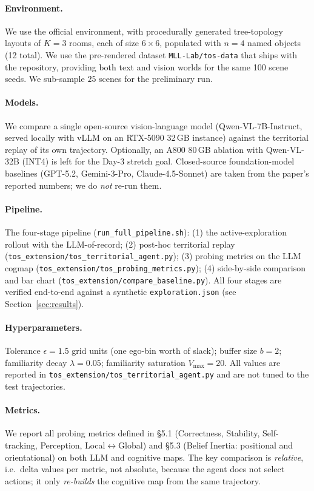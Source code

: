 \paragraph{Environment.} We use the official \tos environment, with
procedurally generated tree-topology layouts of $K{=}3$ rooms, each
of size $6{\times}6$, populated with $n{=}4$ named objects (12 total).
We use the pre-rendered dataset \texttt{MLL-Lab/tos-data} that ships
with the \tos repository, providing both text and vision worlds for
the same 100 scene seeds. We sub-sample $25$ scenes for the
preliminary run.

\paragraph{Models.} We compare a single open-source vision-language
model (Qwen-VL-7B-Instruct, served locally with vLLM on an
RTX-5090 32\,GB instance) against the territorial replay of its own
trajectory. Optionally, an A800 80\,GB ablation with Qwen-VL-32B
(INT4) is left for the Day-3 stretch goal. Closed-source
foundation-model baselines (GPT-5.2, Gemini-3-Pro, Claude-4.5-Sonnet)
are taken from the \tos paper's reported numbers; we do \emph{not}
re-run them.

\paragraph{Pipeline.} The four-stage pipeline (\verb|run_full_pipeline.sh|):
(1) the \tos active-exploration rollout with the LLM-of-record;
(2) post-hoc territorial replay
(\verb|tos_extension/tos_territorial_agent.py|); (3) probing metrics on
the LLM cogmap (\verb|tos_extension/tos_probing_metrics.py|); (4)
side-by-side comparison and bar chart
(\verb|tos_extension/compare_baseline.py|). All four stages are
verified end-to-end against a synthetic \texttt{exploration.json} (see
Section~\ref{sec:results}).

\paragraph{Hyperparameters.} Tolerance $\epsilon{=}1.5$ grid units
(one ego-bin worth of slack); buffer size $b{=}2$; familiarity decay
$\lambda{=}0.05$; familiarity saturation $V_{\max}{=}20$. All values
are reported in \verb|tos_extension/tos_territorial_agent.py| and are
not tuned to the test trajectories.

\paragraph{Metrics.} We report all probing metrics defined in \tos
\S5.1 (Correctness, Stability, Self-tracking, Perception,
Local$\leftrightarrow$Global) and \S5.3 (Belief Inertia: positional
and orientational) on both LLM and \tb cognitive maps. The
key comparison is \emph{relative}, i.e.\ delta values per metric, not
absolute, because the \tb agent does not select actions; it only
\emph{re-builds} the cognitive map from the same trajectory.
